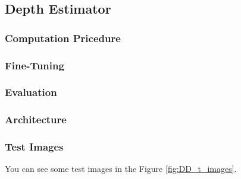 \documentclass[a4paper, openany]{book}
\begin{document}
	
\newpage

\subsection{Depth Estimator}
	\vspace{0.3cm}


\subsubsection{Computation Pricedure}
	\vspace{0.3cm}
	
	
\subsubsection{Fine-Tuning}
	\vspace{0.3cm}
	
	
\subsubsection{Evaluation}
	\vspace{0.3cm}
	
\subsubsection{Architecture}


\newpage

\subsubsection{Test Images}
	\vspace{0.3cm}
	
You can see some test images in the Figure \ref{fig:DD_t_images}.
\end{document}
